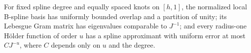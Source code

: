 For fixed spline degree and equally spaced knots on \([h,1]\), the normalized local B-spline basis has uniformly bounded overlap and a partition of unity; its Lebesgue Gram matrix has eigenvalues comparable to \(J^{-1}\); and every radius-one Hölder function of order \(u\) has a spline approximant with uniform error at most \(C J^{-u}\), where \(C\) depends only on \(u\) and the degree.